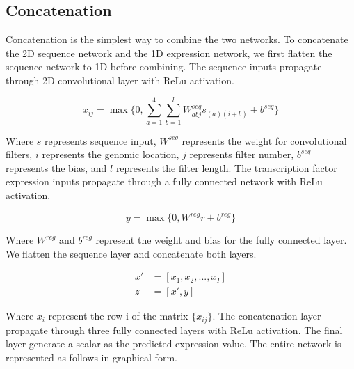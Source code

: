 \documentclass{article}
\begin{document}
\subsection{Concatenation}

Concatenation is the simplest way to combine the two networks. To concatenate the 2D sequence network and the 1D expression network, we first flatten the sequence network to 1D before combining. The sequence inputs propagate through 2D convolutional layer with ReLu activation. 

\begin{equation} \label{eq1}
x_{ij}=\max \{ 0, \sum_{a=1}^{4} \sum_{b=1}^{l} W_{abj}^{seq} s_{(a)(i+b)} + b^{seq}\}
\end{equation} 

Where $s$ represents sequence input, $W^{seq}$ represents the weight for convolutional filters, $i$ represents the genomic location, $j$ represents filter number, $b^{seq}$ represents the bias, and $l$ represents the filter length. The transcription factor expression inputs propagate through a fully connected network with ReLu activation. 

\begin{equation} \label{eq2}
y=\max \{0, W^{reg}r + b^{reg}\}
\end{equation}

Where $W^{reg}$ and $b^{reg}$ represent the weight and bias for the fully connected layer. We flatten the sequence layer and concatenate both layers. 

\begin{align} \label{eq34}
x' &= [x_{1},x_{2},...,x_{I}] \\
z &= [x',y]
\end{align}

Where $x_{i}$ represent the row i of the matrix $\{ x_{ij} \}$. The concatenation layer propagate through three fully connected layers with ReLu activation. The final layer generate a scalar as the predicted expression value. The entire network is represented as follows in graphical form. 
\end{document}
